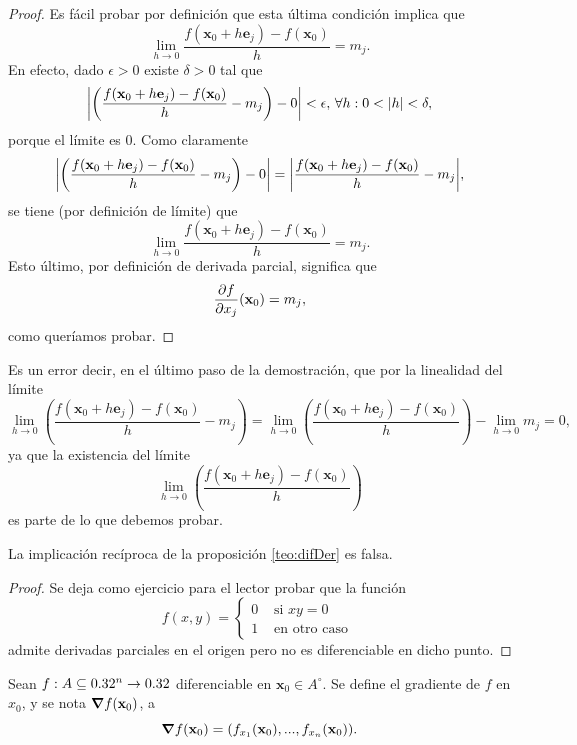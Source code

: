 \begin{proof}
Es f\'acil probar por definici\'on que esta \'ultima condici\'on implica que
\[
 \lim_{h \to 0} \frac{ f(\mathbf{x}_0 + h \mathbf{e}_j) - f(\mathbf{x}_0) }{h} = m_j.
\]
En efecto, dado $\epsilon > 0$ existe $\delta > 0$ tal que 
\[
 \abs{ \left( \frac{ f(\mathbf{x}_0 + h \mathbf{e}_j) - f(\mathbf{x}_0) }{h} - m_j \right) - 0 } < \epsilon, \, \forall h : 0 < \abs{h} < \delta,
\]
porque el l\'imite es 0. Como claramente 
\[
 \abs{ \left( \frac{ f(\mathbf{x}_0 + h \mathbf{e}_j) - f(\mathbf{x}_0) }{h} - m_j \right) - 0 } = 
 \abs{\frac{ f(\mathbf{x}_0 + h \mathbf{e}_j) - f(\mathbf{x}_0) }{h} - m_j},
\]
se tiene (por definici\'on de l\'imite) que 
\[
 \lim_{h \to 0} \frac{ f(\mathbf{x}_0 + h \mathbf{e}_j) - f(\mathbf{x}_0) }{h} = m_j.
\]
Esto \'ultimo, por definici\'on de derivada parcial, significa que
\[
  \dfrac{\partial f}{\partial x_j} (\mathbf{x}_0) = m_j,
\]
como quer\'iamos probar. 
\end{proof}


\begin{obs}
 Es un error decir, en el \'ultimo paso de la demostraci\'on, que por la linealidad del l\'imite
 \[
  \lim_{h \to 0} \left( \frac{f(\mathbf{x}_0 + h \mathbf{e}_j) - f(\mathbf{x}_0)}{h} - m_j \right) = 
  \lim_{h \to 0} \left( \frac{f(\mathbf{x}_0 + h \mathbf{e}_j) - f(\mathbf{x}_0)}{h} \right) - \lim_{h \to 0} m_j = 0,
 \]
ya que la existencia del l\'imite 
\[
\lim_{h \to 0} \left( \frac{f(\mathbf{x}_0 + h \mathbf{e}_j) - f(\mathbf{x}_0)}{h} \right)
\]
es parte de lo que debemos probar.
\end{obs}





\begin{obs} La implicaci\'on rec\'iproca de la proposici\'on \eqref{teo:difDer} es falsa.
\begin{proof} Se deja como ejercicio para el lector probar que  la funci\'on  
 \[
        f(x,y) = 
        \begin{cases}
         0 & \text{ si } x y = 0  \\
         1 & \text{ en otro caso }
        \end{cases}
\]admite  derivadas parciales en el origen  pero no es diferenciable en dicho punto.
\end{proof}
\end{obs}


\begin{definition}  Sean $f: A  \subseteq  0.32^n \to 0.32$  diferenciable en $\mathbf{x}_0 \in A^{\circ}$. Se define el gradiente de $f$ en $x_0$, y se nota $ \grad f (\mathbf{x}_0)$, a
$$ \grad f (\mathbf{x}_0) =  (f_{x_1}(\mathbf{x}_0),...,f_{x_n}(\mathbf{x}_0) ). $$
\end{definition}




